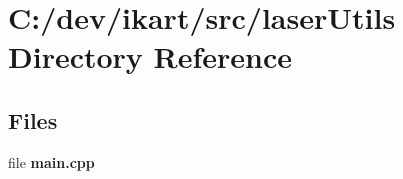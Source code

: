 \section{C\+:/dev/ikart/src/laser\+Utils Directory Reference}
\label{dir_40768bbde37f5af8e4fea91d77c97b49}
\subsection*{Files}
\begin{DoxyCompactItemize}
\item 
file {\bfseries main.\+cpp}
\end{DoxyCompactItemize}
